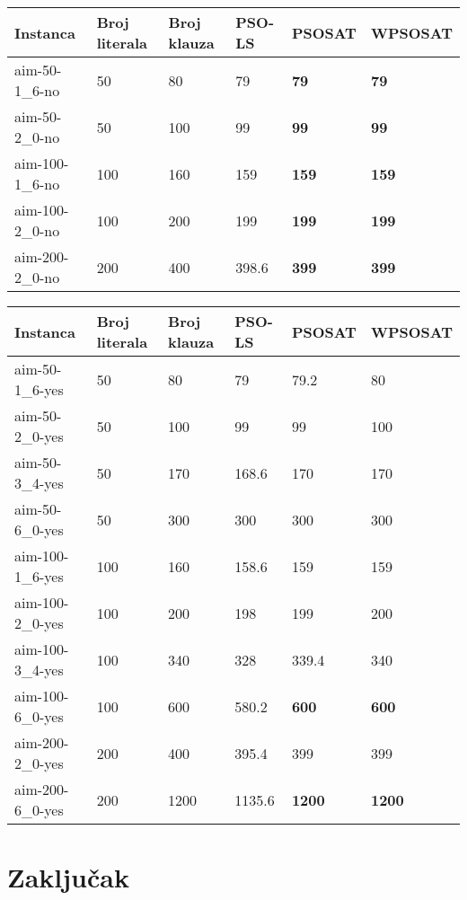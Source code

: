 \documentclass{article}
\begin{document}
\begin{table}[h!]
\centering
{}\label{tab:UNSAT}
\begin{tabular}{ |p{3cm}|p{2cm}|p{2cm}||p{2cm}|p{2cm}|p{2cm}| } \hline
 Instanca & Broj literala & Broj klauza & PSO-LS & PSOSAT & WPSOSAT \\ \hline
 aim-50-1\_6-no & 50 & 80 & 79 & \textbf{79} & \textbf{79} \\ \hline
 aim-50-2\_0-no & 50 & 100 & 99 & \textbf{99} & \textbf{99} \\ \hline
 aim-100-1\_6-no & 100 & 160 & 159 & \textbf{159} & \textbf{159} \\ \hline
 aim-100-2\_0-no & 100 & 200 & 199 & \textbf{199} & \textbf{199} \\ \hline
 aim-200-2\_0-no & 200 & 400 & 398.6 & \textbf{399} & \textbf{399} \\ \hline
\end{tabular}
\end{table}

\begin{table}[h!]
\centering
{}\label{tab:SAT} 
\begin{tabular}{ |p{3cm}|p{2cm}|p{2cm}||p{2cm}|p{2cm}|p{2cm}|}  \hline
 Instanca & Broj literala & Broj klauza & PSO-LS & PSOSAT & WPSOSAT \\ \hline
 aim-50-1\_6-yes & 50 & 80 & 79 & 79.2 & 80 \\ \hline
 aim-50-2\_0-yes & 50 & 100 & 99 & 99 & 100 \\ \hline
 aim-50-3\_4-yes & 50 & 170 & 168.6 & 170 & 170 \\ \hline
 aim-50-6\_0-yes & 50 & 300 & 300 & 300 & 300 \\ \hline
 \hline
 aim-100-1\_6-yes & 100 & 160 & 158.6 & 159 & 159 \\ \hline
 aim-100-2\_0-yes & 100 & 200 & 198 & 199 & 200 \\ \hline
 aim-100-3\_4-yes & 100 & 340 & 328 & 339.4 & 340 \\ \hline
 aim-100-6\_0-yes & 100 & 600 & 580.2 & \textbf{600} & \textbf{600} \\ \hline
 \hline
 aim-200-2\_0-yes & 200 & 400 & 395.4 & 399 & 399 \\ \hline
 aim-200-6\_0-yes & 200 & 1200 & 1135.6 & \textbf{1200} & \textbf{1200} \\ \hline
\end{tabular}
\end{table}


\section{Zaključak}
\label{sec:zakljucak}


\appendix
 

\end{document}
